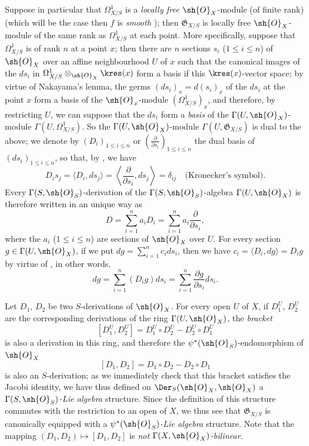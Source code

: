 \begin{env}[16.5.8]
\label{IV.16.5.8}
Suppose in particular that $\Omega_{X/S}^1$ is a \emph{locally free} $\sh{O}_X$-module (of finite rank) (which will be the case then $f$ is \emph{smooth} );
then $\mathfrak{G}_{X/S}$ is locally free $\sh{O}_X$-module of the same rank as $\Omega_{X/S}^1$ at each point.
More specifically, suppose that $\Omega_{X/S}^1$ is of rank $n$ at a point $x$;
then there are $n$ sections $s_i$ ($1 \leq i \leq n$) of $\sh{O}_X$ over an affine neighbourhood $U$ of $x$ such that the canonical images of the $ds_i$ in $\Omega_{X/S}^1 \otimes_{\sh{O}_X} \kres(x)$ form a basis if this $\kres(x)$-vector space;
by virtue of Nakayama's lemma, the germs $(ds_i)_x = d(s_i)_x$ of the $ds_i$ at the point $x$ form a basis of the $\sh{O}_x$-module $(\Omega_{X/S}^1)_x$, and therefore, by restricting $U$, we can suppose that the $ds_i$ form a \emph{basis} of the $\Gamma(U, \sh{O}_X)$-module $\Gamma(U, \Omega_{X/S}^1)$.
So the $\Gamma(U, \sh{O}_X)$-module $\Gamma(U, \mathfrak{G}_{X/S})$ is dual to the above;
we denote by $(D_i)_{1 \leq i \leq n}$ or $\left(\frac{\partial}{\partial s_i}\right)_{1 \leq i \leq n}$ the dual basis of $(ds_i)_{1 \leq i \leq n}$, so that, by , we have
\[
\label{IV.16.5.8.1}
  D_i s_j = \langle D_i, ds_j \rangle = \left\langle \frac{\partial}{\partial s_i}, ds_j \right\rangle = \delta_{ij} \quad \text{(Kronecker's symbol)}.
  \tag{16.5.8.1}
\]
Every $\Gamma(S, \sh{O}_S)$-derivation of the $\Gamma(S, \sh{O}_S)$-algebra $\Gamma(U, \sh{O}_X)$ is therefore written in an unique way as 
\[
  D = \sum_{i = 1}^n a_i D_i = \sum_{i = 1}^n a_i \frac{\partial}{\partial s_i},
\] 
where the $a_i$ ($1 \leq i \leq n$) are sections of $\sh{O}_X$ over $U$.
For every section $g \in \Gamma(U, \sh{O}_X)$, if we put $dg = \sum_{i = 1}^n c_i ds_i$, then we have $c_i = \langle D_i, dg \rangle = D_i g$ by virtue of , in other words,
\[
\label{IV.16.5.8.2}
  dg = \sum_{i = 1}^n (D_i g) ds_i = \sum_{i = 1}^n \frac{\partial g}{\partial s_i} ds_i.
  \tag{16.5.8.2}
\]
\end{env}

\begin{env}[16.5.9]
\label{IV.16.5.9}
Let $D_1$, $D_2$ be two $S$-derivations of $\sh{O}_X$. 
For every open $U$ of $X$, if $D_1^U$, $D_2^U$ are the corresponding derivations of the ring $\Gamma(U, \sh{O}_X)$, the \emph{bracket}
\[
  [D_1^U, D_2^U] = D_1^U \circ D_2^U - D_2^U \circ D_1^U
\]
is also a derivation in this ring, and therefore the $\psi^*(\sh{O}_S)$-endomorphism of $\sh{O}_X$
\[
\label{IV.16.5.9.1}
  [D_1, D_2] = D_1 \circ D_2 - D_2 \circ D_1
  \tag{16.5.9.1}
\]
is also an $S$-derivation;
as we immediately check that this bracket satisfies the Jacobi identity, we have thus defined on $\Der_S(\sh{O}_X, \sh{O}_X)$ a \emph{$\Gamma(S, \sh{O}_S)$-Lie algebra} structure.
Since the definition of this structure commutes with the restriction to an open of $X$, we thus see that $\mathfrak{G}_{X/S}$ is canonically equipped with a \emph{ $\psi^*(\sh{O}_S)$-Lie algebra} structure.
Note that the mapping $(D_1, D_2) \mapsto [D_1, D_2]$ is \emph{not $\Gamma(X, \sh{O}_X)$-bilinear}.
\end{env} 

